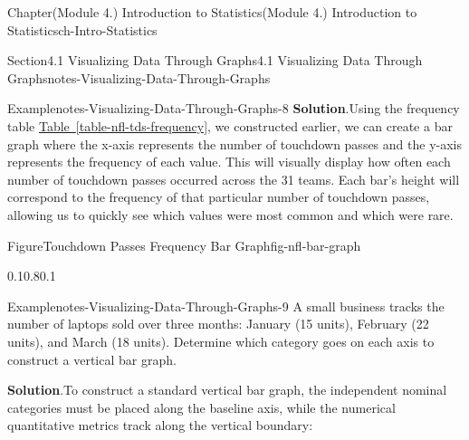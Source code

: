 \documentclass[oneside,10pt,]{book}
\newcommand{\blocktitlefont}{\relax}
\newcommand{\xreffont}{\relax}
\begin{document}
\begin{chapterptx}{Chapter}{(Module 4.) Introduction to Statistics}{}{(Module 4.) Introduction to Statistics}{}{}{ch-Intro-Statistics}
\begin{sectionptx}{Section}{4.1 Visualizing Data Through Graphs}{}{4.1 Visualizing Data Through Graphs}{}{}{notes-Visualizing-Data-Through-Graphs}
\begin{example}{Example}{}{notes-Visualizing-Data-Through-Graphs-8}
\noindent\textbf{\blocktitlefont Solution}.\hypertarget{notes-Visualizing-Data-Through-Graphs-8-2}{}\quad{}Using the frequency table \hyperref[table-nfl-tds-frequency]{Table~{\xreffont\ref{table-nfl-tds-frequency}}}, we constructed earlier, we can create a bar graph where the x-axis represents the number of touchdown passes and the y-axis represents the frequency of each value. This will visually display how often each number of touchdown passes occurred across the 31 teams. Each bar's height will correspond to the frequency of that particular number of touchdown passes, allowing us to quickly see which values were most common and which were rare.%
\begin{figureptx}{Figure}{Touchdown Passes Frequency Bar Graph}{fig-nfl-bar-graph}{}%
\begin{image}{0.1}{0.8}{0.1}{}%
%
\end{image}%
\tcblower
\end{figureptx}%
\end{example}
\begin{example}{Example}{}{notes-Visualizing-Data-Through-Graphs-9}%
A small business tracks the number of laptops sold over three months: January (15 units), February (22 units), and March (18 units). Determine which category goes on each axis to construct a vertical bar graph.%
\par\smallskip%
\noindent\textbf{\blocktitlefont Solution}.\hypertarget{notes-Visualizing-Data-Through-Graphs-9-2}{}\quad{}To construct a standard vertical bar graph, the independent nominal categories must be placed along the baseline axis, while the numerical quantitative metrics track along the vertical boundary:%

\end{example}
\end{sectionptx}
\end{chapterptx}
\end{document}
